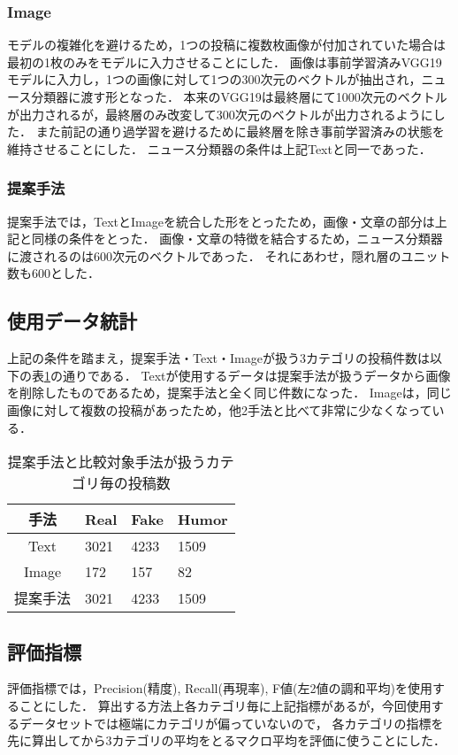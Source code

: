 \subsubsection{Image}
モデルの複雑化を避けるため，1つの投稿に複数枚画像が付加されていた場合は最初の1枚のみをモデルに入力させることにした．
画像は事前学習済みVGG19モデルに入力し，1つの画像に対して1つの300次元のベクトルが抽出され，ニュース分類器に渡す形となった．
本来のVGG19は最終層にて1000次元のベクトルが出力されるが，最終層のみ改変して300次元のベクトルが出力されるようにした．
また前記の通り過学習を避けるために最終層を除き事前学習済みの状態を維持させることにした．
ニュース分類器の条件は上記Textと同一であった．
%
\subsubsection{提案手法}
提案手法では，TextとImageを統合した形をとったため，画像・文章の部分は上記と同様の条件をとった．
画像・文章の特徴を結合するため，ニュース分類器に渡されるのは600次元のベクトルであった．
それにあわせ，隠れ層のユニット数も600とした．
%
\subsection{使用データ統計}
上記の条件を踏まえ，提案手法・Text・Imageが扱う3カテゴリの投稿件数は以下の表\ref{table:posts}の通りである．
Textが使用するデータは提案手法が扱うデータから画像を削除したものであるため，提案手法と全く同じ件数になった．
Imageは，同じ画像に対して複数の投稿があったため，他2手法と比べて非常に少なくなっている．

\begin{table}[h]
    \caption{提案手法と比較対象手法が扱うカテゴリ毎の投稿数}
    \label{table:posts}
    \centering
    \begin{tabular}{clll}
        \hline
        手法 & Real & Fake & Humor \\
        \hline \hline
        Text & 3021 & 4233 & 1509 \\
        Image & 172 & 157 & 82 \\
        提案手法 & 3021 & 4233 & 1509 \\
        \hline
    \end{tabular}
\end{table}

\subsection{評価指標}
評価指標では，Precision(精度), Recall(再現率), F値(左2値の調和平均)を使用することにした．
算出する方法上各カテゴリ毎に上記指標があるが，今回使用するデータセットでは極端にカテゴリが偏っていないので，
各カテゴリの指標を先に算出してから3カテゴリの平均をとるマクロ平均を評価に使うことにした．

